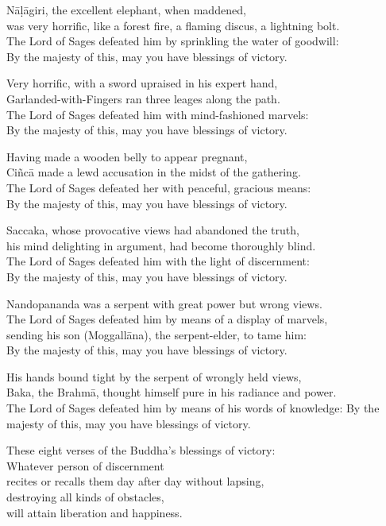 \begin{paritta}
Nāḷāgiri, the excellent elephant, when maddened,\\
was very horrific, like a forest fire, a flaming discus, a lightning bolt.\\
The Lord of Sages defeated him by sprinkling the water of goodwill:\\
By the majesty of this, may you have blessings of victory.

Very horrific, with a sword upraised in his expert hand,\\
Garlanded-with-Fingers ran three leages along the path.\\
The Lord of Sages defeated him with mind-fashioned marvels:\\
By the majesty of this, may you have blessings of victory.

Having made a wooden belly to appear pregnant,\\
Ciñcā made a lewd accusation in the midst of the gathering.\\
The Lord of Sages defeated her with peaceful, gracious means:\\
By the majesty of this, may you have blessings of victory.

Saccaka, whose provocative views had abandoned the truth,\\
his mind delighting in argument, had become thoroughly blind.\\
The Lord of Sages defeated him with the light of discernment:\\
By the majesty of this, may you have blessings of victory.

Nandopananda was a serpent with great power but wrong views.\\
The Lord of Sages defeated him by means of a display of marvels,\\
sending his son (Moggallāna), the serpent-elder, to tame him:\\
By the majesty of this, may you have blessings of victory.

His hands bound tight by the serpent of wrongly held views,\\
Baka, the Brahmā, thought himself pure in his radiance and power.\\
The Lord of Sages defeated him by means of his words of knowledge:
By the majesty of this, may you have blessings of victory.

These eight verses of the Buddha's blessings of victory:\\
Whatever person of discernment\\
recites or recalls them day after day without lapsing,\\
destroying all kinds of obstacles,\\
will attain liberation and happiness.


\end{paritta}
